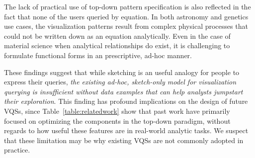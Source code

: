 \par The lack of practical use of top-down pattern specification is also reflected in the fact that none of the users queried by equation. In both astronomy and genetics use cases, the visualization patterns result from complex physical processes that could not be written down as an equation analytically. Even in the case of material science when analytical relationships do exist, it is challenging to formulate functional forms in an prescriptive, ad-hoc manner.
\par These findings suggest that while sketching is an useful analogy for people to express their queries, \emph{the existing ad-hoc, sketch-only model for visualization querying is insufficient without data examples that can help analysts jumpstart their exploration}. This finding has profound implications on the design of future VQSs, since Table~\ref{table:relatedwork} show that past work have primarily focused on optimizing the components in the top-down paradigm, without regards to how useful these features are in real-world analytic tasks.
We suspect that these limitation may be why existing VQSs are not commonly adopted in practice. %

